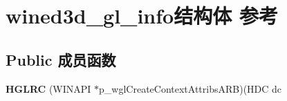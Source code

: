 \hypertarget{structwined3d__gl__info}{}\section{wined3d\+\_\+gl\+\_\+info结构体 参考}
\label{structwined3d__gl__info}
\subsection*{Public 成员函数}
\begin{DoxyCompactItemize}
\item 
\mbox{\label{structwined3d__gl__info_abee2f3a3f45825a1aff6ffeb4987f2da}} 
{\bfseries H\+G\+L\+RC} (W\+I\+N\+A\+PI $\ast$p\+\_\+wgl\+Create\+Context\+Attribs\+A\+RB)(H\+DC dc
\end{DoxyCompactItemize}

